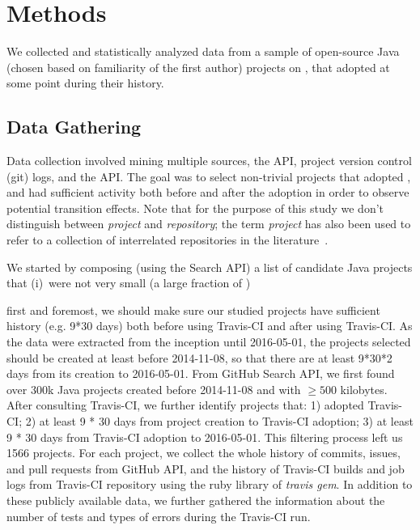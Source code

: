 
\section{Methods}
\label{sec:method}

We collected and statistically analyzed data from a sample of open-source 
Java (chosen based on familiarity of the first author) projects on \GH, that 
adopted \Tvis at some point during their history.

\subsection{Data Gathering}

Data collection involved mining multiple sources, the \GH API, project version 
control (git) logs, and the \Tvis API.
The goal was to select non-trivial projects that adopted \Tvis, and had sufficient
activity both before and after the adoption in order to observe potential
transition effects.
Note that for the purpose of this study we don't distinguish between \emph{project} 
and \emph{repository}; the term \emph{project} has also been used to refer to 
a collection of interrelated repositories in the literature~\cite{vasilescu2016sky}.

We started by composing (using the \GH Search API) a list of candidate Java 
projects that (i)~were not very small (a large fraction of )


first and foremost, we should make sure our studied projects have sufficient history (e.g. 9*30 days) both before using Travis-CI and after using Travis-CI.  As the data were extracted from the inception until 2016-05-01, the projects selected should be created at least before 2014-11-08, so that there are at least 9*30*2 days from its creation to 2016-05-01. 
From GitHub Search API, we first found over 300k Java projects created before 2014-11-08 and with $\geqslant 500$ kilobytes. After consulting Travis-CI, we further identify projects that: 1) adopted Travis-CI; 2) at least 9 * 30 days from project creation to Travis-CI adoption; 3) at least 9 * 30 days from Travis-CI adoption to 2016-05-01. This filtering process left us 1566 projects.  
For each project, we collect the whole history of commits, issues, and pull requests from GitHub API, and the history of Travis-CI builds and job logs from Travis-CI repository using the ruby library of \textit{travis gem}.  In addition to these publicly available data, we further gathered the information about the number of tests and types of errors during the Travis-CI run.

